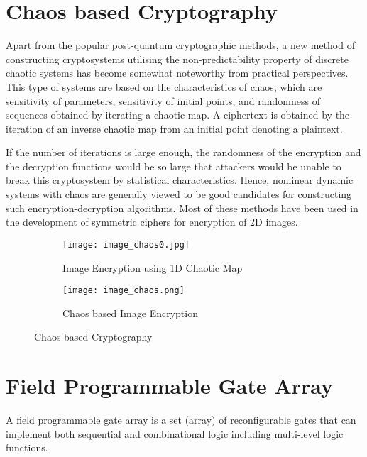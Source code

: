 

\section{Chaos based Cryptography}
Apart from the popular post-quantum cryptographic methods, a new method of constructing cryptosystems utilising the non-predictability property of discrete chaotic systems has become somewhat noteworthy from practical perspectives. This type of systems are based on the characteristics of chaos, which are sensitivity of parameters, sensitivity of initial points, and randomness of sequences obtained by iterating a chaotic map. A ciphertext is obtained by the iteration of an inverse chaotic map from an initial point denoting a plaintext. 

If the number of iterations is large enough, the randomness of the encryption and the decryption functions would be so large that attackers would be unable to break this cryptosystem by statistical characteristics. Hence, nonlinear dynamic systems with chaos are generally viewed to be good candidates for constructing such encryption-decryption algorithms. Most of these methods have been used in the development of symmetric ciphers for encryption of 2D images.

\begin{figure}[H]
\begin{subfigure}{0.5\textwidth}
\texttt{[image: image\_chaos0.jpg]}
\caption{Image Encryption using 1D Chaotic Map}\label{fig:image_chaos0}
\end{subfigure}
\begin{subfigure}{0.5\textwidth}
\texttt{[image: image\_chaos.png]}
\caption{Chaos based Image Encryption}\label{fig:image_chaos}
\end{subfigure}
\caption{Chaos based Cryptography}\label{fig:image0}
\end{figure}

\section{Field Programmable Gate Array}
A field programmable gate array is a set (array) of reconfigurable gates that can implement both sequential and combinational logic including multi-level logic functions.

